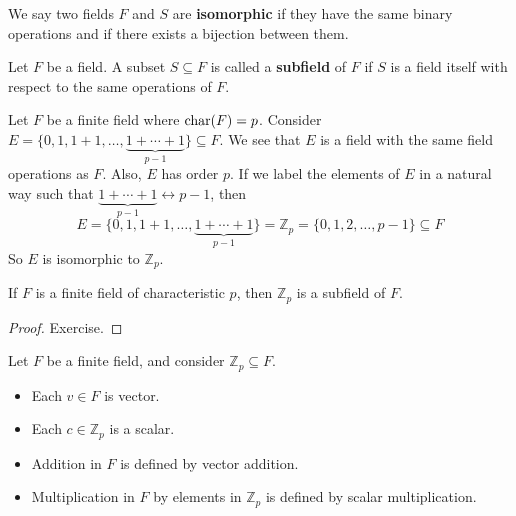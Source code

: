
\begin{defbox}
    \begin{definition}
        We say two fields $F$ and $S$ are \textbf{isomorphic} if they have the same
        binary operations and if there exists a bijection between them.
    \end{definition}
\end{defbox}

\begin{defbox}
    \begin{definition}
        Let $ F $ be a field. A subset $ S\subseteq F $ is called a \textbf{subfield}
        of $ F $ if $ S $ is a field itself with respect to the same operations
        of $ F $.
    \end{definition}
\end{defbox}

\begin{exbox}
    \begin{example}[Subfield]
        Let $ F $ be a finite field where $ \operatorname{char}(F)=p $. Consider
        $ E=\{0,1,1+1,\ldots,\underbrace{1+\cdots+1}_{p-1}\}\subseteq F $.
        We see that $ E $ is a field with the same field operations as $ F $.
        Also, $ E $ has order $ p $. If we label the elements of $ E $
        in a natural way such that $ \underbrace{1+\cdots+1}_{p-1}
            \longleftrightarrow p-1 $,
        then
        \[ E=\{0,1,1+1,\ldots,\underbrace{1+\cdots+1}_{p-1}\}
            = \mathbb{Z}_p= \{0,1,2,\ldots ,p-1\}\subseteq F \]
        So $ E $ is isomorphic to $ \mathbb{Z}_p $.
    \end{example}
\end{exbox}

\begin{thmbox}
    \begin{theorem}
        If $ F $ is a finite field of characteristic $ p $, then
        $ \mathbb{Z}_p $ is a subfield of $ F $.
    \end{theorem}
\end{thmbox}

\begin{proof}
    Exercise.
\end{proof}

\begin{defbox}
    \begin{definition}
        Let $ F $ be a finite field, and consider $ \mathbb{Z}_p\subseteq F $.
        \begin{itemize}
            \item Each $ v\in F $ is vector.
            \item Each $ c\in\mathbb{Z}_p $ is a scalar.
            \item Addition in $ F $ is defined by vector addition.
            \item Multiplication in $ F $ by elements in $ \mathbb{Z}_p $
                  is defined by scalar multiplication.
        \end{itemize}
    \end{definition}
\end{defbox}

